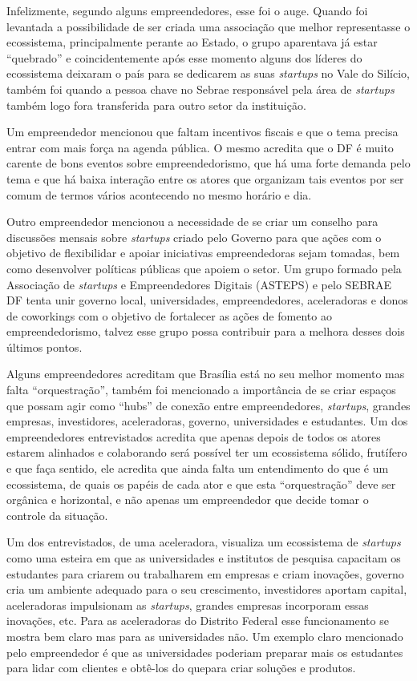 Infelizmente, segundo alguns empreendedores, esse foi o auge. Quando foi levantada a possibilidade de ser criada uma associação que melhor representasse o ecossistema, principalmente perante ao Estado, o grupo aparentava já estar ``quebrado'' e coincidentemente após esse momento alguns dos líderes do ecossistema deixaram o país para se dedicarem as suas \textit{startups} no Vale do Silício, também foi quando a pessoa chave no Sebrae responsável pela área de \textit{startups} também logo fora transferida para outro setor da instituição.

Um empreendedor mencionou que faltam incentivos fiscais e que o tema precisa entrar com mais força na agenda pública. O mesmo acredita que o DF é muito carente de bons eventos sobre empreendedorismo, que há uma forte demanda pelo tema e que há baixa interação entre os atores que organizam tais eventos por ser comum de termos vários acontecendo no mesmo horário e dia. 

Outro empreendedor mencionou a necessidade de se criar um conselho para discussões mensais sobre \textit{startups} criado pelo Governo para que ações com o objetivo de flexibilidar e apoiar iniciativas empreendedoras sejam tomadas, bem como desenvolver políticas públicas que apoiem o setor. Um grupo formado pela Associação de \textit{startups} e Empreendedores Digitais (ASTEPS) e pelo SEBRAE DF tenta unir governo local, universidades, empreendedores, aceleradoras e donos de coworkings com o objetivo de fortalecer as ações de fomento ao empreendedorismo, talvez esse grupo possa contribuir para a melhora desses  dois últimos pontos.

Alguns empreendedores acreditam que Brasília está no seu melhor momento mas falta ``orquestração'', também foi mencionado a importância de se criar espaços que possam agir como ``hubs'' de conexão entre empreendedores, \textit{startups}, grandes empresas, investidores, aceleradoras, governo, universidades e estudantes. Um dos empreendedores entrevistados acredita que apenas depois de todos os atores estarem alinhados e colaborando será possível ter um ecossistema sólido, frutífero e que faça sentido, ele acredita que ainda falta um entendimento do que é um ecossistema, de quais os papéis de cada ator e que esta ``orquestração'' deve ser orgânica e horizontal, e não apenas um empreendedor que decide tomar o controle da situação. 

Um dos entrevistados, de uma aceleradora, visualiza um ecossistema de \textit{startups} como uma esteira em que as universidades e institutos de pesquisa capacitam os estudantes para criarem ou trabalharem em empresas e criam inovações, governo cria um ambiente adequado para o seu crescimento, investidores aportam capital, aceleradoras impulsionam as \textit{startups}, grandes empresas incorporam essas inovações, etc. Para as aceleradoras do Distrito Federal esse funcionamento se mostra bem claro mas para as universidades não. Um exemplo claro mencionado pelo empreendedor é que as universidades poderiam preparar mais os estudantes para lidar com clientes e obtê-los do quepara criar soluções e produtos.

